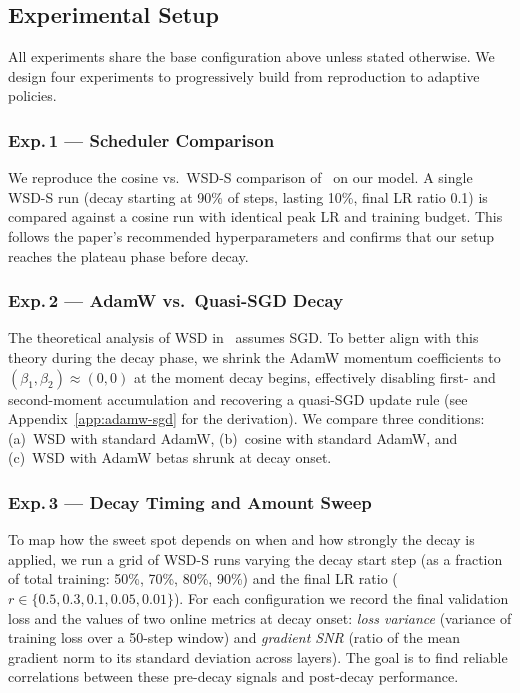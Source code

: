 \documentclass[10pt,conference,compsocconf]{IEEEtran}
\begin{document}
\subsection{Experimental Setup}

All experiments share the base configuration above unless stated otherwise.
We design four experiments to progressively build from reproduction to adaptive policies.

\subsubsection{Exp.\,1 — Scheduler Comparison}
We reproduce the cosine vs.\ WSD-S comparison of~\citet{wen2024river} on our
model. A single WSD-S run (decay starting at 90\% of steps, lasting 10\%,
final LR ratio 0.1) is compared against a cosine run with identical peak LR
and training budget. This follows the paper's recommended hyperparameters
and confirms that our setup reaches the plateau phase before decay.

\subsubsection{Exp.\,2 — AdamW vs.\ Quasi-SGD Decay}
The theoretical analysis of WSD in~\citet{wen2024river} assumes SGD.
To better align with this theory during the decay phase, we shrink the AdamW
momentum coefficients to $(\beta_1, \beta_2) \approx (0, 0)$ at the moment
decay begins, effectively disabling first- and second-moment accumulation and
recovering a quasi-SGD update rule (see Appendix~\ref{app:adamw-sgd} for
the derivation). We compare three conditions: (a)~WSD with standard AdamW,
(b)~cosine with standard AdamW, and (c)~WSD with AdamW betas shrunk at
decay onset.

\subsubsection{Exp.\,3 — Decay Timing and Amount Sweep}
To map how the sweet spot depends on when and how strongly the decay is
applied, we run a grid of WSD-S runs varying the decay start step (as a
fraction of total training: 50\%, 70\%, 80\%, 90\%) and the final LR ratio
($r \in \{0.5, 0.3, 0.1, 0.05, 0.01\}$). For each configuration we record
the final validation loss and the values of two online metrics at decay onset:
\emph{loss variance} (variance of training loss over a 50-step window) and
\emph{gradient SNR} (ratio of the mean gradient norm to its standard deviation
across layers). The goal is to find reliable correlations between these
pre-decay signals and post-decay performance.
\end{document}

